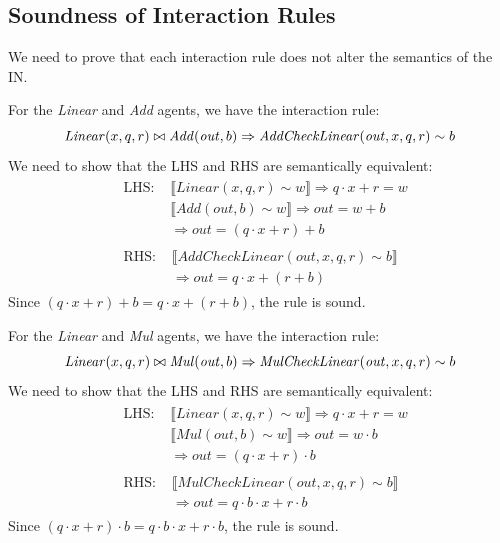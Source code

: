 \subsection{Soundness of Interaction Rules}
\label{sec:soundness-of-interaction-rules}

We need to prove that each interaction rule does not alter the semantics of the IN.

\begin{lemma}
	For the \textit{Linear} and \textit{Add} agents, we have the interaction rule:
	$$
	\mathit{Linear}(x, q, r) \bowtie \mathit{Add}(\mathit{out}, b) \Rightarrow \mathit{AddCheckLinear}(\mathit{out}, x, q, r) \sim b \\
	$$
	We need to show that the LHS and RHS are semantically equivalent:
	$$
	\begin{aligned}
		& \begin{aligned}
			\text{LHS: } & \llbracket \mathit{Linear}(x, q, r) \sim w \rrbracket \Rightarrow q \cdot x + r = w \\
			& \llbracket \mathit{Add}(\mathit{out}, b) \sim w \rrbracket \Rightarrow \mathit{out} = w + b \\
			& \Rightarrow \mathit{out} = (q \cdot x + r) + b
		\end{aligned} \\
		& \begin{aligned}
			\text{RHS: } & \llbracket \mathit{AddCheckLinear}(\mathit{out}, x, q, r) \sim b \rrbracket \\
			& \Rightarrow \mathit{out} = q \cdot x + (r + b)
		\end{aligned}
	\end{aligned}
	$$
	Since $(q \cdot x + r) + b = q \cdot x + (r + b)$, the rule is sound.
\end{lemma}

\begin{lemma}
	For the \textit{Linear} and \textit{Mul} agents, we have the interaction rule:
	$$
	\mathit{Linear}(x, q, r) \bowtie \mathit{Mul}(\mathit{out}, b) \Rightarrow \mathit{MulCheckLinear}(\mathit{out}, x, q, r) \sim b \\
	$$
	We need to show that the LHS and RHS are semantically equivalent:
	$$
	\begin{aligned}
		& \begin{aligned}
			\text{LHS: } & \llbracket \mathit{Linear}(x, q, r) \sim w \rrbracket \Rightarrow q \cdot x + r = w \\
			& \llbracket \mathit{Mul}(\mathit{out}, b) \sim w \rrbracket \Rightarrow \mathit{out} = w \cdot b \\
			& \Rightarrow \mathit{out} = (q \cdot x + r) \cdot b
		\end{aligned} \\
		& \begin{aligned}
			\text{RHS: } & \llbracket \mathit{MulCheckLinear}(\mathit{out}, x, q, r) \sim b \rrbracket \\
			& \Rightarrow \mathit{out} = q \cdot b \cdot x + r \cdot b
		\end{aligned}
	\end{aligned}
	$$
	Since $(q \cdot x + r) \cdot b = q \cdot b \cdot x + r \cdot b$, the rule is sound.
\end{lemma}


